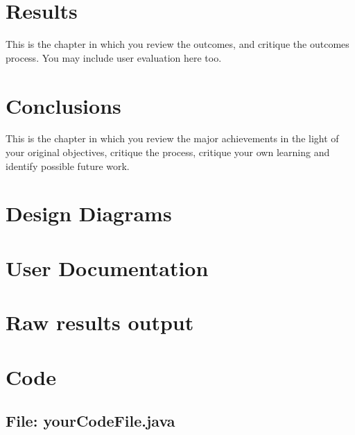 \documentclass[11pt,openright,a4paper]{report}
\begin{document}
\chapter{Results}
This is the chapter in which you review the outcomes, and
critique the outcomes process.  You may include user evaluation here
too.



\chapter{Conclusions}
%

This is the chapter in which you review the major achievements in the
light of your original objectives, critique the process, critique your
own learning and identify possible future work.





\appendix


\chapter{Design Diagrams}

\chapter{User Documentation}

\chapter{Raw results output}

\chapter{Code}


\begin{landscape}
\begin{multicols}{2}
\section{File: yourCodeFile.java}

\end{multicols}
\end{landscape}
\end{document}
